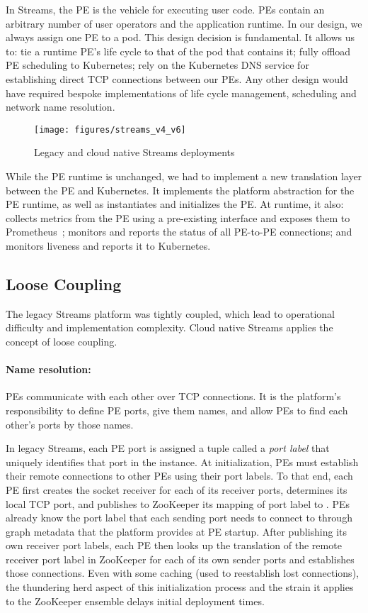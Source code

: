 In Streams, the PE is the vehicle for executing user code. PEs contain an
arbitrary number of user operators and the application runtime.  In our design,
we always assign one PE to a pod. This design decision is fundamental. It
allows us to: tie a runtime PE's life cycle to that of the pod that contains
it; fully offload PE scheduling to Kubernetes; rely on the Kubernetes DNS
service for establishing direct TCP connections between our PEs.  Any other
design would have required bespoke implementations of life cycle management,
scheduling and network name resolution.

\begin{figure}[t!]
  \centering
  \texttt{[image: figures/streams\_v4\_v6]}
  \caption{Legacy and cloud native Streams deployments}
  \label{fig:streams_v4_v6}
\end{figure}

While the PE runtime is unchanged, we had to implement a new translation layer
between the PE and Kubernetes. It implements the platform abstraction for the PE
runtime, as well as instantiates and initializes the PE. At runtime, it
also: collects metrics from the PE using a pre-existing interface and exposes
them to Prometheus~\cite{prometheus}; monitors and reports the status of all
PE-to-PE connections; and monitors liveness and reports it to Kubernetes.

\subsection{Loose Coupling}
\label{sec:coupling}

The legacy Streams platform was tightly coupled, which lead to operational
difficulty and implementation complexity. Cloud native Streams applies the
concept of loose coupling.

\paragraph{Name resolution:} PEs communicate with each other over TCP
connections. It is the platform's responsibility to define PE ports, give them
names, and allow PEs to find each other's ports by those names.

In legacy Streams, each PE port is assigned a  tuple called
a \emph{port label} that uniquely identifies that port in the instance.
At initialization, PEs must establish their remote connections to other PEs
using their port labels. To that end, each PE first creates the socket receiver
for each of its receiver ports, determines its local TCP port, and publishes to 
ZooKeeper its mapping of port label to . PEs already
know the port label that each sending port needs to connect to through graph
metadata that the platform provides at PE startup. After publishing its own
receiver port labels, each PE then looks up the translation of the remote
receiver port label in ZooKeeper for each of its own sender ports and
establishes those connections.  Even with some caching (used to reestablish lost
connections), the thundering herd aspect of this initialization process and the
strain it applies to the ZooKeeper ensemble delays initial deployment times.

